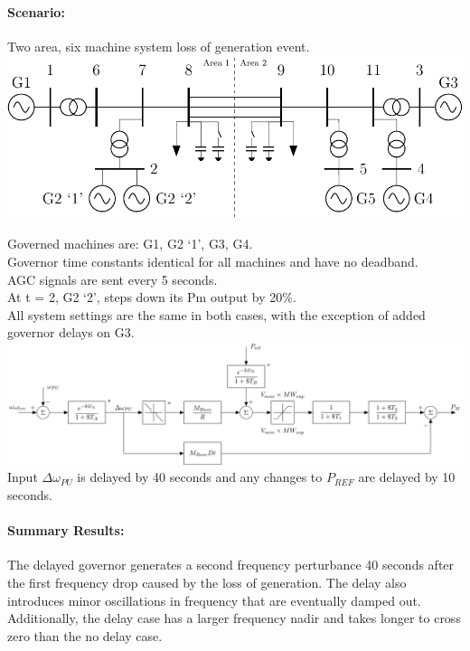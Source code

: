 \documentclass[12pt]{article}
\begin{document}
\paragraph{Scenario: } 
Two area, six machine system loss of generation event. \\
\includegraphics[width=\linewidth]{../../models/sixMachine/sixMachine}

Governed machines are: G1, G2 `1', G3, G4.\\
Governor time constants identical for all machines and have no deadband.\\
AGC signals are sent every 5 seconds.\\

At t = 2, G2 `2', steps down its Pm output by 20\%.\\

All system settings are the same in both cases, with the exception of added governor delays on G3.\\

\includegraphics[width=\linewidth]{../../models/tgov1/tgov1DBdelay}
\\

Input $\Delta \omega_{PU}$ is delayed by 40 seconds and any changes to $P_{REF}$ are delayed by 10 seconds.

\paragraph{Summary Results:} The delayed governor generates a second frequency perturbance 40 seconds after the first frequency drop caused by the loss of generation.
The delay also introduces minor oscillations in frequency that are eventually damped out.
Additionally, the delay case has a larger frequency nadir and takes longer to cross zero than the no delay case.
\end{document}
